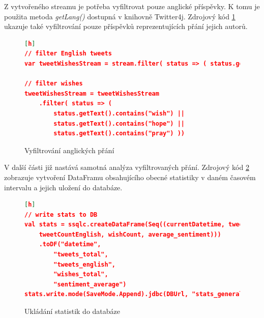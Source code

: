 \documentclass[thesis=B,czech]{FITthesis}[2012/06/26]
\begin{document}
Z vytvořeného streamu je potřeba vyfiltrovat pouze anglické příspěvky. K tomu je použita metoda \textit{getLang()} dostupná v knihovně Twitter4j. Zdrojový kód \ref{fig:spark-filter} ukazuje také vyfiltrování pouze příspěvků reprezentujících přání jejich autorů. 

\begin{figure}
\begin{lstlisting}[language=json,firstnumber=1][h]
// filter English tweets
var tweetWishesStream = stream.filter( status => ( status.getLang() == "en"))

// filter wishes
tweetWishesStream = tweetWishesStream
	.filter( status => (
		status.getText().contains("wish") ||
		status.getText().contains("hope") ||
		status.getText().contains("pray") ))
\end{lstlisting}
\caption{Vyfiltrování anglických přání}
\label{fig:spark-filter}
\end{figure} 

V další části již nastává samotná analýza vyfiltrovaných přání. Zdrojový kód \ref{fig:spark-stats-db} zobrazuje vytvoření DataFramu obsahujícího obecné statistiky v daném časovém intervalu a jejich uložení do databáze. 

\begin{figure}
\begin{lstlisting}[language=json,firstnumber=1][h]
// write stats to DB
val stats = ssqlc.createDataFrame(Seq((currentDatetime, tweetCount,
	tweetCountEnglish, wishCount, average_sentiment)))
	.toDF("datetime",
		"tweets_total",
		"tweets_english",
		"wishes_total",
		"sentiment_average")
stats.write.mode(SaveMode.Append).jdbc(DBUrl, "stats_general_3s", prop)
\end{lstlisting}
\caption{Ukládání statistik do databáze}
\label{fig:spark-stats-db}
\end{figure} 
	
\end{document}
